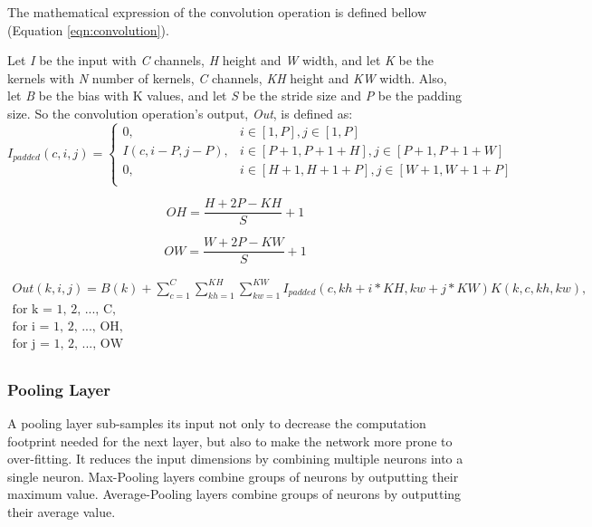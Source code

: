 The mathematical expression of the convolution operation is defined bellow (Equation \ref{eqn:convolution}).

Let \emph{I} be the input with \emph{C} channels, \emph{H} height and \emph{W} width, and let \emph{K} be the kernels with \emph{N} number of kernels, \emph{C} channels, \emph{KH} height and \emph{KW} width. Also, let \emph{B} be the bias with K values, and let \emph{S} be the stride size and \emph{P} be the padding size. So the convolution operation's output, \emph{Out}, is defined as:
\begin{equation}
	I_{padded}(c, i, j) = \begin{cases}
		0,                  & i \in [1, P], j \in [1, P]                         \\
		I(c, i - P, j - P), & i \in [P + 1, P + 1 + H], j \in [P + 1, P + 1 + W] \\
		0,                  & i \in [H + 1, H + 1 + P], j \in [W + 1, W + 1 + P] \\
	\end{cases}
\end{equation}

\begin{equation}
	OH = \frac{H + 2P - KH}{S} + 1
\end{equation}

\begin{equation}
	OW = \frac{W + 2P - KW}{S} + 1
\end{equation}

\begin{equation}
	\label{eqn:convolution}
	\begin{split}
		Out(k, i, j) = B(k) +
		\sum_{c = 1}^{C} \sum_{kh = 1}^{KH} \sum_{kw = 1}^{KW}
		I_{padded}(c, kh + i * KH, kw + j * KW) K(k, c, kh, kw),\\
		\mbox{for k = 1, 2, ..., C},\\
		\mbox{for i = 1, 2, ..., OH},\\
		\mbox{for j = 1, 2, ..., OW}\\
	\end{split}
\end{equation}

\subsubsection{Pooling Layer}
A pooling layer sub-samples its input not only to decrease the computation footprint needed for the next layer, but also to make the network more prone to over-fitting. It reduces the input dimensions by combining multiple neurons into a single neuron. Max-Pooling layers combine groups of neurons by outputting their maximum value. Average-Pooling layers combine groups of neurons by outputting their average value.

